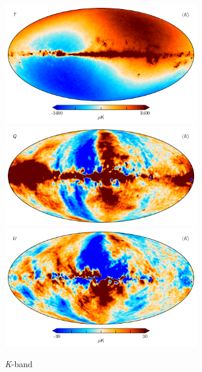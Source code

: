 \documentclass[twocolumn]{../../common/aa}
\newcommand{\K}[0]{\textit K}
\begin{document}
\begin{figure}
	\centering
	\includegraphics[width=0.75\textwidth]{figures/023-WMAP_K_mu_I.pdf}
	\includegraphics[width=0.75\textwidth]{figures/023-WMAP_K_mu_Q.pdf}
	\includegraphics[width=0.75\textwidth]{figures/023-WMAP_K_mu_U.pdf}
	\caption{\K-band}
	\label{fig:kband}
\end{figure}
\end{document}
